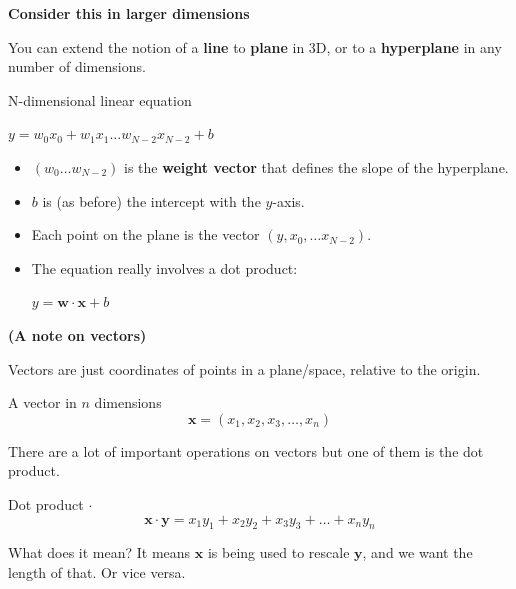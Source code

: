 \documentclass{beamer}
\newcommand{\pagestepalt}[2]{
  \begin{frame}[t]
    \begin{minipage}[t][0.26\textheight][t]{\textwidth}
      \begin{center}
        \huge
        \textbf{#1}
      \end{center}
    \end{minipage}
    
    \begin{minipage}[t][0.7\textheight][c]{\textwidth}
      #2
    \end{minipage}
  \end{frame}
}
\begin{document}
\pagestepalt{Consider this in larger dimensions}{
  You can extend the notion of a \textbf{line} to \textbf{plane} in
  3D, or to a \textbf{hyperplane} in any number of dimensions.\pause
  \begin{block}{N-dimensional linear equation}
    \begin{center}
      $y = w_0x_0 + w_1x_1 \ldots w_{N-2}x_{N-2} + b$
    \end{center}
  \end{block}\pause
  \begin{itemize}
  \item $(w_0 \ldots w_{N-2})$ is the \textbf{weight vector} that defines
    the slope of the hyperplane.\pause
  \item $b$ is (as before) the intercept with the $y$-axis.\pause
  \item Each point on the plane is the vector $(y, x_0, \ldots x_{N-2})$.\pause
  \item The equation really involves a dot product:
    \begin{center}
      $y = \mathbf{w} \cdot \mathbf{x} + b$
    \end{center}
  \end{itemize}
}

\pagestepalt{(A note on vectors)}{
  \vspace{-1cm}
  Vectors are just coordinates of points in a plane/space, relative to the \alert{origin}.\pause
  \begin{block}{A vector in $n$ dimensions}
    \[\mathbf{x} = (x_1, x_2, x_3, \ldots,x_n)\]
  \end{block}\pause
  There are a lot of important operations on vectors but one of them is the
  \alert{dot product}.\pause
  \begin{block}{Dot product $\cdot$}
    \[\mathbf{x} \cdot \mathbf{y} = x_1y_1 + x_2y_2 + x_3y_3 + \ldots + x_ny_n\]
  \end{block}\pause
  What does it mean? It means $\mathbf{x}$ is being used to \alert{rescale}
  $\mathbf{y}$, and we want the length of that. Or vice versa.
}
\end{document}
